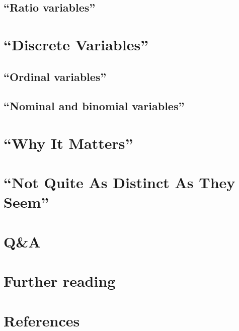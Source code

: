 \documentclass[]{book}
\theoremstyle{definition}
\theoremstyle{definition}
\theoremstyle{definition}
\theoremstyle{remark}
\begin{document}
\subsection{\texorpdfstring{``Ratio
variables''}{Ratio variables}}\label{ratio-variables}

\section{\texorpdfstring{``Discrete
Variables''}{Discrete Variables}}\label{discrete-variables}

\subsection{\texorpdfstring{``Ordinal
variables''}{Ordinal variables}}\label{ordinal-variables}

\subsection{\texorpdfstring{``Nominal and binomial
variables''}{Nominal and binomial variables}}\label{nominal-and-binomial-variables}

\section{\texorpdfstring{``Why It
Matters''}{Why It Matters}}\label{why-it-matters}

\section{\texorpdfstring{``Not Quite As Distinct As They
Seem''}{Not Quite As Distinct As They Seem}}\label{not-quite-as-distinct-as-they-seem}

\section{Q\&A}\label{qa}

\section*{Further reading}\label{further-reading-6}

\section*{References}\label{references-6}
\end{document}
